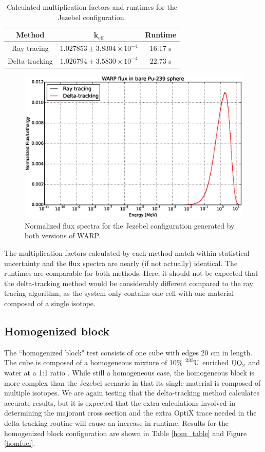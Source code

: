 \begin{table}[h!]
\centering
\caption{Calculated multiplication factors and runtimes for the Jezebel configuration.}
\label{pu_table}
\begin{tabular}{| c | c | c |}
\hline
\textbf{Method} & $\mathbf{k_{\mathrm{eff}}}$ & \textbf{Runtime} \\
\hline
Ray tracing & $1.027853 \pm 3.8304 \times 10^{-4}$ & 16.17 s \\
Delta-tracking & $1.026794 \pm 3.5830 \times 10^{-4}$ & 22.73 s \\
\hline
\end{tabular}
\end{table}

\begin{figure}[h!]
\includegraphics[width=\textwidth]{img/godiva.eps}
\caption{Normalized flux spectra for the Jezebel configuration generated by both versions of WARP.
\label{jezebel}}
\end{figure}

The multiplication factors calculated by each method match within statistical uncertainty and the flux
spectra are nearly (if not actually) identical. The runtimes are comparable for both 
methods. Here, it should not be expected that the delta-tracking method would be considerably different 
compared to the ray tracing algorithm, as the system only contains one cell with one material composed of 
a single isotope.

\subsection{Homogenized block}

The ``homogenized block" test consists of one cube with edges 20 cm in length. The cube is composed of a
homogeneous mixture of 10\% $\ce{^{235}U}$ enriched $\ce{UO_2}$ and water at a 1:1 ratio \cite{warp2015}.
While still a homogeneous case, the homogeneous block is more complex than the Jezebel scenario in that
its single material is composed of multiple isotopes. We are again testing that the delta-tracking
method calculates accurate results, but it is expected that the extra calculations involved in determining
the majorant cross section and the extra OptiX trace needed in the delta-tracking routine will cause an 
increase in runtime. Results for the homogenized block configuration are shown in Table \ref{hom_table} 
and Figure \ref{homfuel}.


